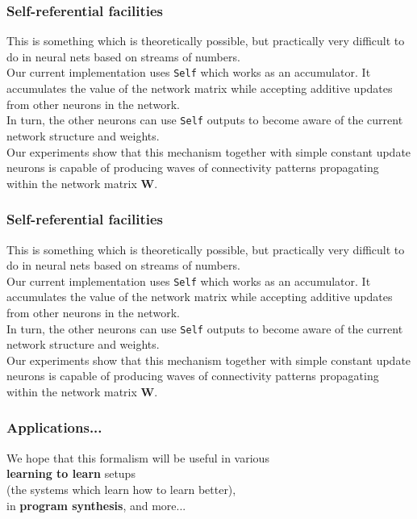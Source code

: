 \documentclass{beamer}
\newcommand{\msgray}[1]{{\color{mygray} #1}}
\begin{document}
\begin{frame}

  \frametitle{Self-referential facilities}

This is something which is theoretically possible, but practically very difficult
to do in neural nets based on streams of numbers.\\[2ex]

Our current implementation uses {\tt Self} which works as an accumulator.
It accumulates the value of the network matrix while
accepting additive updates from other neurons in the network.\\[2ex]

In turn, the other neurons can use {\tt Self} outputs to become aware of
the current network structure and weights.\\[2ex]

\msgray{Our experiments show that this mechanism together with simple
constant update neurons is capable of producing waves of connectivity
patterns propagating within the network matrix {\bf W}.}

\end{frame}


\begin{frame}

  \frametitle{Self-referential facilities}

This is something which is theoretically possible, but practically very difficult
to do in neural nets based on streams of numbers.\\[2ex]

Our current implementation uses {\tt Self} which works as an accumulator.
It accumulates the value of the network matrix while
accepting additive updates from other neurons in the network.\\[2ex]

In turn, the other neurons can use {\tt Self} outputs to become aware of
the current network structure and weights.\\[2ex]

Our experiments show that this mechanism together with simple
constant update neurons is capable of producing waves of connectivity
patterns propagating within the network matrix {\bf W}.

\end{frame}

\begin{frame}

  \frametitle{Applications...}

We hope that this formalism will be useful in various\\ {\bf learning to learn} setups\\
(the systems which learn how to learn better),\\ in {\bf program synthesis}, and more...

\end{frame}
\end{document}
